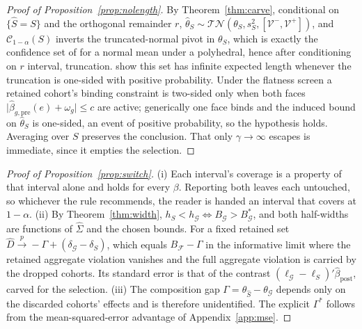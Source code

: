 \documentclass[12pt]{article}
\theoremstyle{remark}
\begin{document}
\begin{proof}[Proof of Proposition~\ref{prop:nolength}]
By Theorem~\ref{thm:carve}, conditional on $\{\hat S=S\}$ and the orthogonal remainder $r$,
$\hat\theta_S\sim\mathcal{TN}(\theta_S,s_S^2,[\mathcal V^-,\mathcal V^+])$, and $\mathcal C_{1-\alpha}(S)$
inverts the truncated-normal pivot in $\theta_S$, which is exactly the confidence set of \citet{lee2016}
for a normal mean under a polyhedral, hence after conditioning on $r$ interval, truncation.
\citet{kivaranovicleeb2021} show this set has infinite expected length whenever the truncation is one-sided
with positive probability. Under the flatness screen a retained cohort's binding constraint is two-sided
only when both faces $\lvert\hat\beta_{g,\mathrm{pre}}(e)+\omega_g\rvert\le c$ are active; generically one
face binds and the induced bound on $\hat\theta_S$ is one-sided, an event of positive probability, so the
hypothesis holds. Averaging over $S$ preserves the conclusion. That only $\gamma\to\infty$ escapes is
immediate, since it empties the selection.
\end{proof}

\begin{proof}[Proof of Proposition~\ref{prop:switch}]
(i) Each interval's coverage is a property of that interval alone and holds for every $\beta$. Reporting
both leaves each untouched, so whichever the rule recommends, the reader is handed an interval that covers
at $1-\alpha$. (ii) By Theorem~\ref{thm:width}, $h_S<h_{\mathcal G}\iff B_{\mathcal G}>B_{\mathcal G}^\ast$,
and both half-widths are functions of $\hat\Sigma$ and the chosen bounds. For a fixed retained set
$\hat D\xrightarrow{p}-\Gamma+(\delta_{\mathcal G}-\delta_S)$, which equals $B_{\mathcal F}-\Gamma$ in the
informative limit where the retained aggregate violation vanishes and the full aggregate violation is
carried by the dropped cohorts. Its standard error is that of the contrast
$(\ell_{\mathcal G}-\ell_S)'\hat\beta_{\mathrm{post}}$, carved for the selection. (iii) The composition gap
$\Gamma=\theta_{\hat S}-\theta_{\mathcal G}$ depends only on
the discarded cohorts' effects and is therefore unidentified. The explicit $\Gamma^\ast$ follows from the
mean-squared-error advantage of Appendix~\ref{app:mse}.
\end{proof}
\end{document}
